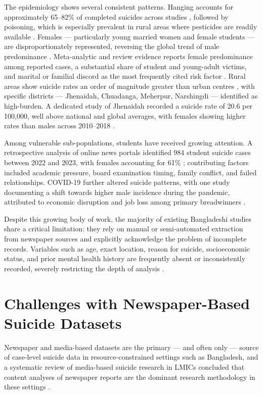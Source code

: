 The epidemiology shows several consistent patterns. Hanging accounts for approximately 65--82\% of completed suicides across studies \cite{ref50,ref51}, followed by poisoning, which is especially prevalent in rural areas where pesticides are readily available \cite{ref50}. Females --- particularly young married women and female students --- are disproportionately represented, reversing the global trend of male predominance \cite{ref50}. Meta-analytic and review evidence reports female predominance among reported cases, a substantial share of student and young-adult victims, and marital or familial discord as the most frequently cited risk factor \cite{ref50,ref51}. Rural areas show suicide rates an order of magnitude greater than urban centres \cite{ref50}, with specific districts --- Jhenaidah, Chuadanga, Meherpur, Narshingdi --- identified as high-burden. A dedicated study of Jhenaidah recorded a suicide rate of 20.6 per 100,000, well above national and global averages, with females showing higher rates than males across 2010--2018 \cite{ref29}.

Among vulnerable sub-populations, students have received growing attention. A retrospective analysis of online news portals identified 984 student suicide cases between 2022 and 2023, with females accounting for 61\% \cite{ref30}; contributing factors included academic pressure, board examination timing, family conflict, and failed relationships. COVID-19 further altered suicide patterns, with one study documenting a shift towards higher male incidence during the pandemic, attributed to economic disruption and job loss among primary breadwinners \cite{ref31}.

Despite this growing body of work, the majority of existing Bangladeshi studies share a critical limitation: they rely on manual or semi-automated extraction from newspaper sources and explicitly acknowledge the problem of incomplete records. Variables such as age, exact location, reason for suicide, socioeconomic status, and prior mental health history are frequently absent or inconsistently recorded, severely restricting the depth of analysis \cite{ref51,ref1}.

\section{Challenges with Newspaper-Based Suicide Datasets}

Newspaper and media-based datasets are the primary --- and often only --- source of case-level suicide data in resource-constrained settings such as Bangladesh, and a systematic review of media-based suicide research in LMICs concluded that content analyses of newspaper reports are the dominant research methodology in these settings \cite{ref23}.

